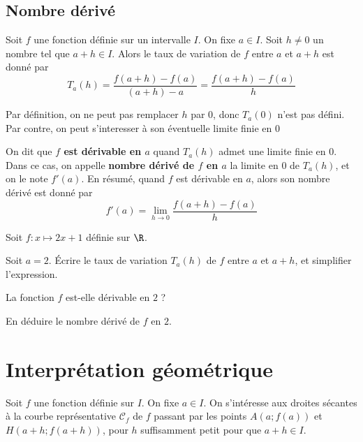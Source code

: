 \documentclass{article}
\begin{document}
\subsection{Nombre dérivé}

\begin{tcolorbox}
Soit $f$ une fonction définie sur un intervalle $I$. On fixe $a \in I$. Soit $h \neq 0$ un nombre tel que $a + h \in I$. Alors le taux de variation de $f$ entre $a$ et $a + h$ est donné par
\begin{equation*}
T_a(h) = \dfrac{f(a + h) - f(a)}{(a + h) - a} = \dfrac{f(a + h) - f(a)}{h}
\end{equation*}
\end{tcolorbox}
\begin{remark}
Par définition, on ne peut pas remplacer $h$ par $0$, donc $T_a(0)$ n'est pas défini. Par contre, on peut s'interesser à son éventuelle limite finie en $0$
\end{remark}
\begin{tcolorbox}
\begin{definition}
On dit que \textbf{$f$ est dérivable en $a$} quand $T_a(h)$ admet une limite finie en $0$. Dans ce cas, on appelle \textbf{nombre dérivé de $f$ en $a$} la limite en $0$ de $T_a(h)$, et on le note $f'(a)$. En résumé, quand $f$ est dérivable en $a$, alors son nombre dérivé est donné par
\begin{equation*}
f'(a) = \lim_{h \to 0} \dfrac{f(a + h) - f(a)}{h}
\end{equation*}
\end{definition}
\end{tcolorbox}
\begin{example}
Soit $f : x \mapsto 2x + 1$ définie sur $\R$.
\begin{enumquestions}
\item Soit $a = 2$. Écrire le taux de variation $T_a(h)$ de $f$ entre $a$ et $a + h$, et simplifier l'expression.
\item La fonction $f$ est-elle dérivable en $2$ ?
\item En déduire le nombre dérivé de $f$ en $2$.
\end{enumquestions}

\emptybox{4cm}
\end{example}

\newpage
\section{Interprétation géométrique}
Soit $f$ une fonction définie sur $I$. On fixe $a \in I$. On s'intéresse aux droites sécantes à la courbe représentative $\mathcal{C}_f$ de $f$ passant par les points $A(a;f(a))$ et $H(a+h;f(a+h))$, pour $h$ suffisamment petit pour que $a + h \in I$.
\end{document}
